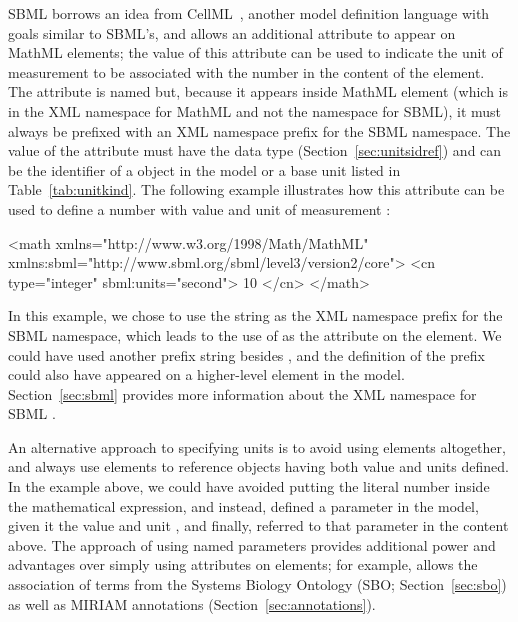 SBML borrows an idea from CellML~\citep{hedley:2001b}, another
model definition language with goals similar to SBML's, and allows
an additional attribute to appear on MathML  elements;
the value of this attribute can be used to indicate the unit of
measurement to be associated with the number in the content of the
 element.  The attribute is named  but,
because it appears inside MathML element (which is in the XML
namespace for MathML and not the namespace for SBML), it must
always be prefixed with an XML namespace prefix for the SBML
\thisLV namespace.  The value of the attribute must have the data
type  (Section~\ref{sec:unitsidref}) and can
be the identifier of a \UnitDefinition object in the model or a
base unit listed in Table~\vref{tab:unitkind}.  The following
example illustrates how this attribute can be used to define a
number with value  and unit of measurement :
\vspace*{-0.5ex}
\begin{example}
<math xmlns="http://www.w3.org/1998/Math/MathML"
      xmlns:sbml="http://www.sbml.org/sbml/level3/version2/core">
    <cn type="integer" sbml:units="second"> 10 </cn>
</math>
\end{example} 
\vspace*{-0.5ex}
In this example, we chose to use the string  as the XML
namespace prefix for the SBML \thisLV namespace, which leads to
the use of  as the attribute on the 
element.  We could have used another prefix string besides
, and the definition of the prefix could also have
appeared on a higher-level element in the model.
Section~\ref{sec:sbml} provides more information about the XML
namespace for SBML \thisLV.

An alternative approach to specifying units is to avoid using
 elements altogether, and always use  elements
to reference \Parameter objects having both value and units
defined.  In the example above, we could have avoided putting the
literal number  inside the mathematical expression, and
instead, defined a parameter in the model, given it the value
 and unit , and finally, referred to that
parameter in the  content above.  The approach of
using named parameters provides additional power and advantages
over simply using  attributes on 
elements; for example, \Parameter allows the association of terms
from the Systems Biology Ontology (SBO; Section~\ref{sec:sbo}) as
well as MIRIAM annotations (Section~\ref{sec:annotations}).

